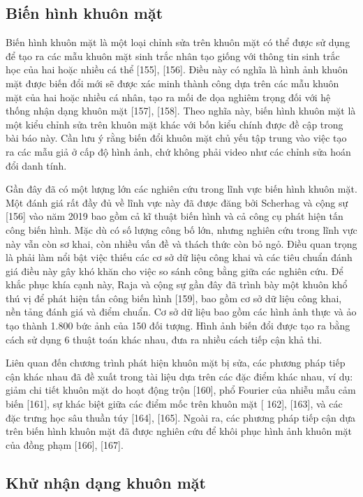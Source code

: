 \documentclass{article}
\begin{document}
\subsection{Biến hình khuôn mặt}

Biến hình khuôn mặt là một loại chỉnh sửa trên khuôn mặt có thể được sử dụng để tạo ra các mẫu khuôn mặt sinh trắc nhân tạo giống với thông tin sinh trắc học của hai hoặc nhiều cá thể [155], [156]. Điều này có nghĩa là hình ảnh khuôn mặt được biến đổi mới sẽ được xác minh thành công dựa trên các mẫu khuôn mặt của hai hoặc nhiều cá nhân, tạo ra mối đe dọa nghiêm trọng đối với hệ thống nhận dạng khuôn mặt [157], [158]. Theo nghĩa này, biến hình khuôn mặt là một kiểu chỉnh sửa trên khuôn mặt khác với bốn kiểu chính được đề cập trong bài báo này. Cần lưu ý rằng biến đổi khuôn mặt chủ yếu tập trung vào việc tạo ra các mẫu giả ở cấp độ hình ảnh, chứ không phải video như các chỉnh sửa hoán đổi danh tính.

Gần đây đã có một lượng lớn các nghiên cứu trong lĩnh vực biến hình khuôn mặt. Một đánh giá rất đầy đủ về lĩnh vực này đã được đăng bởi Scherhag và cộng sự [156] vào năm 2019 bao gồm cả kĩ thuật biến hình và cả công cụ phát hiện tấn công biến hình. Mặc dù có số lượng công bố lớn, nhưng nghiên cứu trong lĩnh vực này vẫn còn sơ khai, còn nhiều vấn đề và thách thức còn bỏ ngỏ. Điều quan trọng là phải làm nổi bật việc thiếu các cơ sở dữ liệu công khai và các tiêu chuẩn đánh giá điều này gây khó khăn cho việc so sánh công bằng giữa các nghiên cứu. Để khắc phục khía cạnh này, Raja và cộng sự gần đây đã trình bày một khuôn khổ thú vị để phát hiện tấn công biến hình [159], bao gồm cơ sở dữ liệu công khai, nền tảng đánh giá và điểm chuẩn. Cơ sở dữ liệu bao gồm các hình ảnh thực và ảo tạo thành 1.800 bức ảnh của 150 đối tượng. Hình ảnh biến đổi được tạo ra bằng cách sử dụng 6 thuật toán khác nhau, đưa ra nhiều cách tiếp cận khả thi.

Liên quan đến chương trình phát hiện khuôn mặt bị sửa, các phương pháp tiếp cận khác nhau đã đề xuất trong tài liệu dựa trên các đặc điểm khác nhau, ví dụ: giảm chi tiết khuôn mặt do hoạt động trộn [160], phổ Fourier của nhiễu mẫu cảm biến [161], sự khác biệt giữa các điểm mốc trên khuôn mặt [ 162], [163], và các đặc trưng học sâu thuần túy [164], [165]. Ngoài ra, các phương pháp tiếp cận dựa trên biến hình khuôn mặt đã được nghiên cứu để khôi phục hình ảnh khuôn mặt của đồng phạm [166], [167].

\subsection{Khử nhận dạng khuôn mặt}
\end{document}
